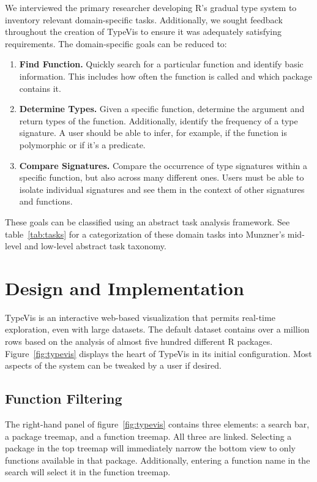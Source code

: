 \documentclass{vgtc}                          %
\begin{document}
We interviewed the primary researcher developing R's gradual type system
to inventory relevant domain-specific tasks.
Additionally, we sought feedback throughout the creation of {\sc TypeVis}
to ensure it was adequately satisfying requirements.
The domain-specific goals can be reduced to:

\begin{enumerate}
\item {\bf Find Function.} Quickly search for a particular function and identify basic information. This includes how often the function is called and which package contains it.
\item {\bf Determine Types.} Given a specific function, determine the argument and return types of the function. Additionally, identify the frequency of a type signature. A user should be able to infer, for example, if the function is polymorphic or if it's a predicate.
\item {\bf Compare Signatures.} Compare the occurrence of type signatures within a specific function, but also across many different ones. Users must be able to isolate individual signatures and see them in the context of other signatures and functions.
\end{enumerate}

These goals can be classified using an abstract task analysis framework.
See table~\ref{tab:tasks} for a categorization of these domain tasks
into Munzner's mid-level and low-level abstract task taxonomy. 


\section{Design and Implementation}

{\sc TypeVis} is an interactive web-based visualization
that permits real-time exploration,
even with large datasets.
The default dataset contains over a million rows
based on the analysis of almost five hundred
different R packages.
Figure~\ref{fig:typevis} displays
the heart of {\sc TypeVis}
in its initial configuration.
Most aspects of the system can be tweaked
by a user if desired.

\subsection{Function Filtering}

The right-hand panel of figure~\ref{fig:typevis}
contains three elements: a search bar,
a package treemap,
and a function treemap.
All three are linked.
Selecting a package
in the top treemap will immediately narrow the
bottom view to only functions available in that package.
Additionally, entering a function name in the search
will select it in the function treemap.
\end{document}

